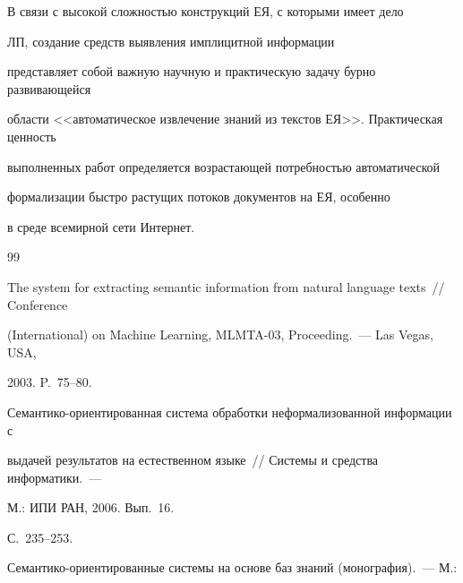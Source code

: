       В связи с высокой сложностью конструкций ЕЯ, с которыми имеет дело 


ЛП, создание средств выявления имплицитной информации 


представляет собой важную научную и практическую задачу бурно развивающейся 


области <<автоматическое извлечение знаний из текстов ЕЯ>>. Практическая ценность 


выполненных работ определяется возрастающей потребностью автоматической 


формализации быстро растущих потоков документов на ЕЯ, особенно 


в среде всемирной сети Интернет.


   


{\small\frenchspacing


{%




\begin{thebibliography}{99}


   






The system for extracting semantic information from natural language texts~/\!\!/ Conference 


(International) on Machine Learning, MLMTA-03, Proceeding.~--- Las Vegas, USA, 


2003. P.~75--80.      









Семантико-ориентированная система обработки неформализованной информации с 


выдачей результатов на естественном языке~/\!\!/ Системы и средства информатики.~---


М.: ИПИ РАН, 2006. Вып.~16. 


С.~235--253.









Семантико-ориентированные системы на основе баз знаний (монография).~--- М.: 



\end{thebibliography}}}
